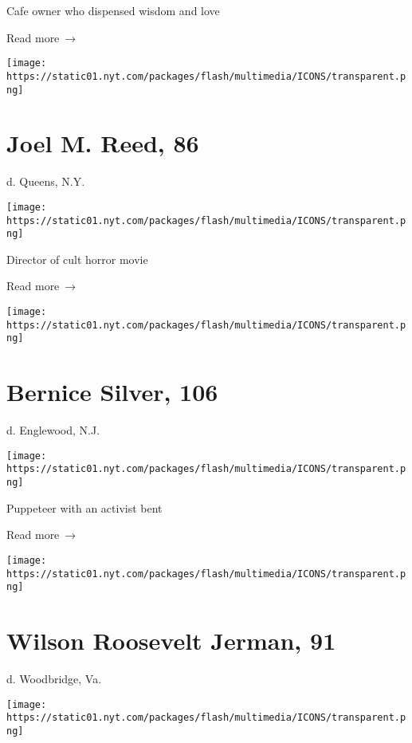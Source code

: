 Cafe owner who dispensed wisdom and love

 Read more~→

\href{https://www.nytimes.com/2020/05/22/obituaries/joel-m-reed-dead-coronavirus.html}{}

\texttt{[image: https://static01.nyt.com/packages/flash/multimedia/ICONS/transparent.png]}

\hypertarget{joel-m-reed-86}{%
\section{Joel M. Reed, 86}\label{joel-m-reed-86}}

d. Queens, N.Y.

\texttt{[image: https://static01.nyt.com/packages/flash/multimedia/ICONS/transparent.png]}

Director of cult horror movie

 Read more~→

\href{https://www.nytimes.com/2020/05/21/obituaries/bernice-silver-dead-coronavirus.html}{}

\texttt{[image: https://static01.nyt.com/packages/flash/multimedia/ICONS/transparent.png]}

\hypertarget{bernice-silver-106}{%
\section{Bernice Silver, 106}\label{bernice-silver-106}}

d. Englewood, N.J.

\texttt{[image: https://static01.nyt.com/packages/flash/multimedia/ICONS/transparent.png]}

Puppeteer with an activist bent

 Read more~→

\href{https://www.nytimes.com/2020/05/21/us/politics/wilson-jerman-dead-coronavirus.html}{}

\texttt{[image: https://static01.nyt.com/packages/flash/multimedia/ICONS/transparent.png]}

\hypertarget{wilson-roosevelt-jerman-91}{%
\section{Wilson Roosevelt Jerman, 91}\label{wilson-roosevelt-jerman-91}}

d. Woodbridge, Va.

\texttt{[image: https://static01.nyt.com/packages/flash/multimedia/ICONS/transparent.png]}

